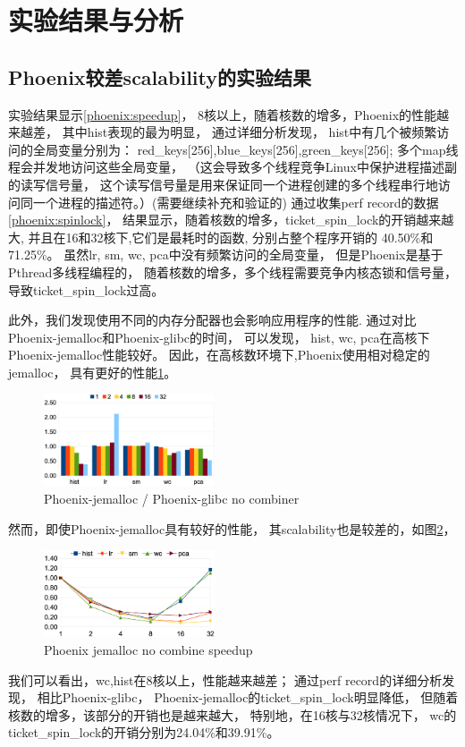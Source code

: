  \section{实验结果与分析}

\subsection{Phoenix较差scalability的实验结果}
实验结果显示\ref{phoenix:speedup}，
8核以上，随着核数的增多，Phoenix的性能越来越差，
其中hist表现的最为明显，
通过详细分析发现，
hist中有几个被频繁访问的全局变量分别为：
red\_keys[256],blue\_keys[256],green\_keys[256];
多个map线程会并发地访问这些全局变量，
{\color{gray}（这会导致多个线程竞争Linux中保护进程描述副的读写信号量，
这个读写信号量是用来保证同一个进程创建的多个线程串行地访
问同一个进程的描述符。）}(需要继续补充和验证的)
通过收集perf record的数据\ref{phoenix:spinlock}，
结果显示，随着核数的增多，ticket\_spin\_lock的开销越来越大,
并且在16和32核下,它们是最耗时的函数,
分别占整个程序开销的 40.50\%和 71.25\%。
虽然lr, sm, wc, pca中没有频繁访问的全局变量，
但是Phoenix是基于Pthread多线程编程的，
随着核数的增多，多个线程需要竞争内核态锁和信号量，
导致ticket\_spin\_lock过高。

此外，我们发现使用不同的内存分配器也会影响应用程序的性能.
通过对比Phoenix-jemalloc和Phoenix-glibc的时间，
可以发现，
hist, wc, pca在高核下Phoenix-jemalloc性能较好。
因此，在高核数环境下,Phoenix使用相对稳定的jemalloc，
具有更好的性能\ref{phoenix:diff_malloc}。
\begin{figure}[!h!t]  
    \centering
    \includegraphics[width=0.45\textwidth]{img/phoenix_diff_malloc.eps}
    \caption{Phoenix-jemalloc / Phoenix-glibc no combiner}
    \label{phoenix:diff_malloc}
\end{figure}

然而，即使Phoenix-jemalloc具有较好的性能，
其scalability也是较差的，如图\ref{phoenix:jemalloc_no_comb_speedup}，
\begin{figure}[!h!t]  
    \centering
    \includegraphics[width=0.45\textwidth]{img/phoenix_jemalloc_no_comb_speedup.eps}
    \caption{Phoenix jemalloc no combine speedup}
    \label{phoenix:jemalloc_no_comb_speedup}
\end{figure}
我们可以看出，wc,hist在8核以上，性能越来越差；
通过perf record的详细分析发现，
相比Phoenix-glibc，
Phoenix-jemalloc的ticket\_spin\_lock明显降低，
但随着核数的增多，该部分的开销也是越来越大，
特别地，在16核与32核情况下，
wc的ticket\_spin\_lock的开销分别为24.04\%和39.91\%。

